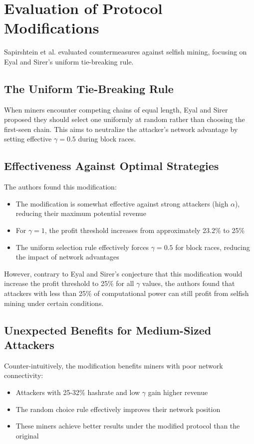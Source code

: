 \documentclass[conference]{IEEEtran}
\begin{document}
\section{Evaluation of Protocol Modifications}

Sapirshtein et al. evaluated countermeasures against selfish mining, focusing on Eyal and Sirer's uniform tie-breaking rule.

\subsection{The Uniform Tie-Breaking Rule}

When miners encounter competing chains of equal length, Eyal and Sirer proposed they should select one uniformly at random rather than choosing the first-seen chain. This aims to neutralize the attacker's network advantage by setting effective $\gamma = 0.5$ during block races.

\subsection{Effectiveness Against Optimal Strategies}

The authors found this modification:
\begin{itemize}
    \item The modification is somewhat effective against strong attackers (high $\alpha$), reducing their maximum potential revenue
    \item For $\gamma = 1$, the profit threshold increases from approximately 23.2\% to 25\% 
    \item The uniform selection rule effectively forces $\gamma = 0.5$ for block races, reducing the impact of network advantages
\end{itemize}

However, contrary to Eyal and Sirer's conjecture that this modification would increase the profit threshold to 25\% for all $\gamma$ values, the authors found that attackers with less than 25\% of computational power can still profit from selfish mining under certain conditions.

\subsection{Unexpected Benefits for Medium-Sized Attackers}

Counter-intuitively, the modification benefits miners with poor network connectivity:
\begin{itemize}
    \item Attackers with 25-32\% hashrate and low $\gamma$ gain higher revenue
    \item The random choice rule effectively improves their network position
    \item These miners achieve better results under the modified protocol than the original
\end{itemize}
\end{document}
